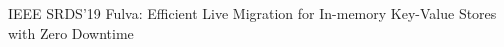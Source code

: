 \cvpub
{IEEE SRDS'19} %
{Fulva: Efficient Live Migration for In-memory Key-Value Stores with Zero Downtime} %
{} %
{} %
{ %
}
